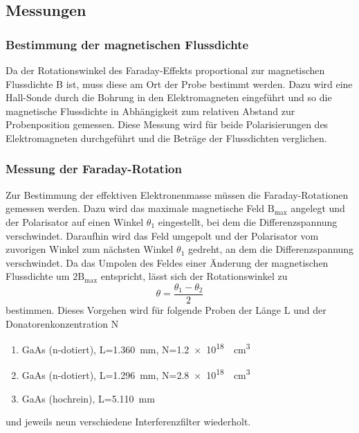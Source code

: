     \subsection{Messungen}
        \subsubsection*{Bestimmung der magnetischen Flussdichte}
            Da der Rotationswinkel des Faraday-Effekts proportional zur magnetischen Flussdichte B ist, muss diese am Ort der Probe bestimmt werden. Dazu wird eine Hall-Sonde durch die Bohrung in den Elektromagneten eingeführt und so die magnetische Flussdichte in Abhängigkeit zum relativen Abstand zur Probenposition gemessen. Diese Messung wird für beide Polarisierungen des Elektromagneten durchgeführt und die Beträge der Flussdichten verglichen.
        \newpage   
        \subsubsection*{Messung der Faraday-Rotation}
            Zur Bestimmung der effektiven Elektronenmasse müssen die Faraday-Rotationen gemessen werden. Dazu wird das maximale magnetische Feld $\text{B}_{\text{max}}$ angelegt und der Polarisator auf einen Winkel $\theta_1$ eingestellt, bei dem die Differenzspannung verschwindet. Daraufhin wird das Feld umgepolt und der Polarisator vom zuvorigen Winkel zum nächsten Winkel $\theta_1$ gedreht, an dem die Differenzspannung verschwindet. Da das Umpolen des Feldes einer Änderung der magnetischen Flussdichte um $2\text{B}_{\text{max}}$ entspricht, lässt sich der Rotationswinkel zu 
            \begin{equation}
                \theta = \frac{\theta_1 - \theta_2}{2}
            \end{equation}
            bestimmen. Dieses Vorgehen wird für folgende Proben der Länge L und der Donatorenkonzentration N
            \begin{enumerate}
                \item GaAs (n-dotiert), L=\SI{1.360}{\milli\metre}, N=\SI{1.2e18}{\per\cubic\centi\metre}
                \item GaAs (n-dotiert), L=\SI{1.296}{\milli\metre}, N=\SI{2.8e18}{\per\cubic\centi\metre}
                \item GaAs (hochrein), L=\SI{5.110}{\milli\metre}
            \end{enumerate}
            

            und jeweils neun verschiedene Interferenzfilter wiederholt.

        

